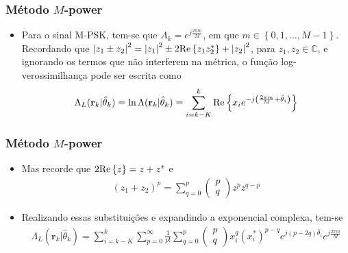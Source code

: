 \begin{frame}[t]
	\frametitle{Método \(M\)-power}
	\begin{itemize}
		\item Para o sinal M-PSK, tem-se que \(A_k = e^{j\frac{2\pi m}{M}}\), em que \(m \in \left\{ 0, 1, \dots, M-1 \right\}\). Recordando que \(\left\lvert z_1 \pm z_2\right\rvert^2 = \left\lvert z_1\right\rvert^2 \pm 2 \textnormal{Re}\left\{ z_1 z_2^* \right\} + \left\lvert z_2\right\rvert^2\), para \(z_1, z_2 \in \mathbb{C}\), e ignorando os termos que não interferem na métrica, o função log-verossimilhança pode ser escrita como
		\begin{align}
            \Lambda_L(\mathbf{r}_k|\hat{\theta}_{k}) = \ln{\Lambda(\mathbf{r}_k|\hat{\theta}_{k})} = \sum_{i = k-K}^{k} \textnormal{Re}\left\{ x_i e^{-j \left(\frac{2\pi m}{M}+\hat{\theta}_i\right)} \right\} %
        \end{align}
	\end{itemize}
	
\end{frame}

\begin{frame}[t]
	\frametitle{Método \(M\)-power}
	\begin{itemize}
        \item Mas recorde que \(2\textnormal{Re}\left\{ z \right\} = z + z^*\) e
        \begin{align}
            \left( z_1 + z_2 \right)^p = \sum_{q=0}^{p} \begin{pmatrix}
                p \\
                q
            \end{pmatrix} z^p z^{q-p}
        \end{align}
        \item Realizando essas substituições e expandindo a exponencial complexa, tem-se
        \begin{align}
            \Lambda_L(\mathbf{r}_k|\hat{\theta}_{k}) = \sum_{i=k-K}^{k} \sum_{p=0}^{\infty}\frac{1}{p!} \sum_{q=0}^{p} \begin{pmatrix}
                p \\
                q
            \end{pmatrix}
            x^{q}_{i} \left( x^{*}_{i} \right)^{p-q} e^{j\left( p-2q \right)\hat{\theta}_i} e^{j\frac{2\pi m}{M}}
        \end{align}
        
    \end{itemize}
\end{frame}

